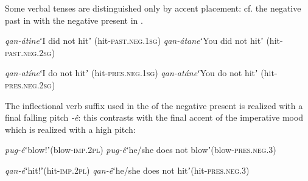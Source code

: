 \documentclass[output=paper]{LSP/langsci}
\begin{document}
Some verbal tenses are distinguished only by accent placement: cf. the negative past in  with the negative present in . 

\begin{exe}
\ex \begin{xlist}
\ex \textit{qan-átine}\hspace{8mm}ʻI did not hitʼ (hit-\textsc{past}.\textsc{neg}.1\textsc{sg}) 
\ex \textit{qan-átane}\hspace{8mm}ʻYou did not hitʼ (hit-\textsc{past}.\textsc{neg}.2\textsc{sg})
\end{xlist}\label{ex:Petrollino:NEGPast}
\end{exe} 

\begin{exe}
\ex \begin{xlist}
\ex \textit{qan-atíne}\hspace{8mm}ʻI do not hitʼ (hit-\textsc{pres}.\textsc{neg}.1\textsc{sg}) 
\ex \textit{qan-atáne}\hspace{8mm}ʻYou do not hitʼ (hit-\textsc{pres}.\textsc{neg}.2\textsc{sg}) 
\end{xlist}\label{ex:Petrollino:NEGPres}
\end{exe} 

The inflectional verb suffix used in the  of the negative present is realized with a final falling pitch \textit{-ê}: this contrasts with the final accent of the imperative mood which is realized with a high pitch:

\begin{exe}
\ex \begin{xlist} \label{ex:Petrollino:IMPNEG}
\ex \textit{pug-é}\hspace{15mm}ʻblow!ʼ\hspace{40mm}(blow-\textsc{imp}.2\textsc{pl})
\ex \textit{pug-ê}\hspace{15mm}ʻhe/she does not blowʼ\hspace{16mm}(blow-\textsc{pres}.\textsc{neg}.3)
\end{xlist}
\end{exe}

\begin{exe}
\ex \begin{xlist}
\ex \textit{qan-é}\hspace{15mm}ʻhit!ʼ\hspace{44mm}(hit-\textsc{imp}.2\textsc{pl})
\ex \textit{qan-ê}\hspace{15mm}ʻhe/she does not hitʼ\hspace{20mm}(hit-\textsc{pres}.\textsc{neg}.3)
\end{xlist}
\end{exe}
\end{document}
